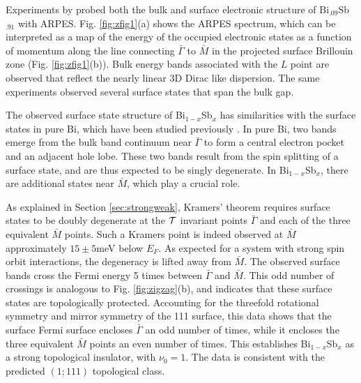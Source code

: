 \documentclass[twocolumn,floatfix,showpacs,rmp,aps]{revtex4}
\begin{document}
Experiments by \textcite{hsieh08} probed both the bulk and
surface electronic structure of Bi$_{.09}$Sb$_{.91}$ with ARPES.
Fig. \ref{fig:zfig1}(a) shows the ARPES spectrum, which can be interpreted
as a map of the energy of the occupied electronic states as a function
of momentum along the line connecting $\bar\Gamma$ to $\bar M$ in the projected
surface Brillouin zone (Fig. \ref{fig:zfig1}(b)).
Bulk energy bands associated with the $L$ point are observed that reflect the
nearly linear 3D Dirac like dispersion.
The same experiments observed several surface states that span the bulk gap.

The observed surface state structure of Bi$_{1-x}$Sb$_x$ has similarities with the
surface states in pure Bi, which have been studied
previously \cite{patthey94,agergaard01,ast01,hirahara06,hofmann06}.  In pure Bi, two
bands emerge from the bulk band continuum near $\bar\Gamma$ to form a central
electron pocket and an adjacent hole lobe.  These two bands result from the
spin splitting of a surface state, and are thus expected to be singly
degenerate.  In Bi$_{1-x}$Sb$_x$, there are additional states near $\bar M$,
which play a crucial role.

As explained in Section \ref{sec:strongweak}, Kramers' theorem requires surface states to be
doubly degenerate at the ${\cal T}$ invariant points $\bar\Gamma$ and each of the
three equivalent $\bar M$ points.
Such a Kramers point is indeed observed at $\bar M$ approximately $15\pm 5$meV below
$E_F$.  As expected for a system
with strong spin orbit interactions, the degeneracy is lifted away from $\bar M$.
The observed surface bands cross the Fermi energy 5 times between $\bar\Gamma$ and
$\bar M$.  This odd number of crossings is analogous to Fig. \ref{fig:zigzag}(b),
and indicates that these surface states are topologically protected.
Accounting for the threefold rotational symmetry and mirror symmetry of the
111 surface, this data shows that the surface Fermi surface encloses
$\bar\Gamma$ an odd number of times, while it encloses the three equivalent
$\bar M$ points an even number of times.  This establishes Bi$_{1-x}$Sb$_x$ as
a strong topological
insulator, with $\nu_0 = 1$.  The data is consistent with the predicted
$(1;111)$ topological class.
\end{document}
